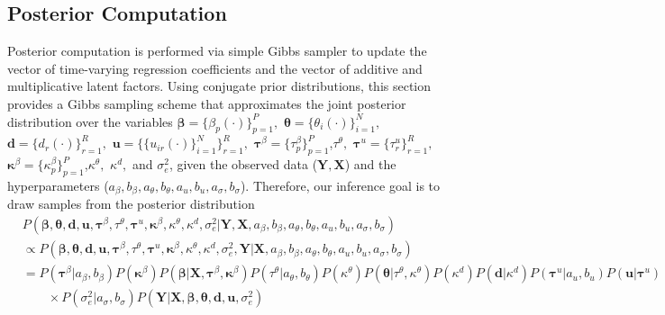 \documentclass[a4paper]{article}
\begin{document}
	\subsection{Posterior Computation}\label{subsec: posterior computation}
	Posterior computation is performed via simple Gibbs sampler to update the vector of time-varying regression coefficients and the vector of additive and multiplicative latent factors. Using conjugate prior distributions, this section provides a Gibbs sampling scheme that approximates the joint posterior distribution over the variables $\boldsymbol{\beta} = \{\beta_p(\cdot)\}_{p=1}^P, $ $\boldsymbol{\theta} = \{\theta_{i}(\cdot)\}_{i=1}^N,$ $\boldsymbol{d} = \{d_r(\cdot)\}_{r=1}^R,$ $\boldsymbol{u} = \{\{u_{ir}(\cdot)\}_{i=1}^N\}_{r=1}^R, $ $\boldsymbol{\tau}^\beta = \{\tau^{\beta}_p\}_{p=1}^P$,$\tau^{\theta},$ $\boldsymbol{\tau}^u =\{\tau^{u}_r\}_{r=1}^R,$ $\boldsymbol{\kappa}^\beta = \{\kappa^{\beta}_p\}_{p=1}^P$,$\kappa^{\theta},$ $\kappa^{d},$ and $\sigma_e^2$, given the observed data ($\boldsymbol{Y},\boldsymbol{X}$) and the hyperparameters ($a_\beta, b_\beta, a_\theta, b_\theta, a_u, b_u, a_\sigma, b_\sigma$). Therefore, our inference goal is to draw samples from the posterior distribution
	\begin{equation}
	\begin{aligned}
	&P(\boldsymbol{\beta}, \boldsymbol{\theta}, \boldsymbol{d}, \boldsymbol{u}, \boldsymbol{\tau}^\beta, \tau^\theta, \boldsymbol{\tau}^u, \boldsymbol{\kappa}^\beta, \kappa^\theta, \kappa^d, \sigma_e^2|\boldsymbol{Y},\boldsymbol{X}, a_\beta, b_\beta, a_\theta, b_\theta, a_u, b_u, a_\sigma, b_\sigma) \\&
	\propto P(\boldsymbol{\beta}, \boldsymbol{\theta}, \boldsymbol{d}, \boldsymbol{u}, \boldsymbol{\tau}^\beta, \tau^\theta, \boldsymbol{\tau}^u, \boldsymbol{\kappa}^\beta, \kappa^\theta, \kappa^d, \sigma_e^2, \boldsymbol{Y}|\boldsymbol{X}, a_\beta, b_\beta, a_\theta, b_\theta, a_u, b_u, a_\sigma, b_\sigma) \\
	&=P(\boldsymbol{\tau}^\beta|a_\beta, b_\beta)P(\boldsymbol{\kappa}^\beta) P(\boldsymbol{\beta}|\boldsymbol{X}, \boldsymbol{\tau}^\beta,  \boldsymbol{\kappa}^\beta)  P({\tau}^\theta|a_\theta, b_\theta)P({\kappa}^\theta)  P(\boldsymbol{\theta}|\tau^\theta, \kappa^\theta) P({\kappa}^d)  P(\boldsymbol{d}|\kappa^d) P(\boldsymbol{\tau}^u|a_u, b_u)P(\boldsymbol{u}|\boldsymbol{\tau}^u)\\&\quad\quad \times P(\sigma_e^2|a_\sigma, b_\sigma) P(\boldsymbol{Y}|\boldsymbol{X}, \boldsymbol{\beta}, \boldsymbol{\theta}, \boldsymbol{d}, \boldsymbol{u},\sigma_e^2)
	\end{aligned}
	\end{equation}
\end{document}

